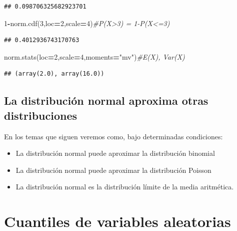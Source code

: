\documentclass[]{book}
\newenvironment{Shaded}{\begin{snugshade}}{\end{snugshade}}
\newcommand{\CommentTok}[1]{\textcolor[rgb]{0.56,0.35,0.01}{\textit{#1}}}
\newcommand{\DecValTok}[1]{\textcolor[rgb]{0.00,0.00,0.81}{#1}}
\newcommand{\NormalTok}[1]{#1}
\newcommand{\OperatorTok}[1]{\textcolor[rgb]{0.81,0.36,0.00}{\textbf{#1}}}
\newcommand{\StringTok}[1]{\textcolor[rgb]{0.31,0.60,0.02}{#1}}
\providecommand{\tightlist}{%
  \setlength{\itemsep}{0pt}\setlength{\parskip}{0pt}}
\begin{document}
\begin{verbatim}
## 0.098706325682923701
\end{verbatim}

\begin{Shaded}
\begin{Highlighting}[]
\DecValTok{1}\OperatorTok{-}\NormalTok{norm.cdf(}\DecValTok{3}\NormalTok{,loc}\OperatorTok{=}\DecValTok{2}\NormalTok{,scale}\OperatorTok{=}\DecValTok{4}\NormalTok{)}\CommentTok{#P(X>3) = 1-P(X<=3)}
\end{Highlighting}
\end{Shaded}

\begin{verbatim}
## 0.4012936743170763
\end{verbatim}

\begin{Shaded}
\begin{Highlighting}[]
\NormalTok{norm.stats(loc}\OperatorTok{=}\DecValTok{2}\NormalTok{,scale}\OperatorTok{=}\DecValTok{4}\NormalTok{,moments}\OperatorTok{=}\StringTok{"mv"}\NormalTok{)}\CommentTok{#E(X), Var(X)}
\end{Highlighting}
\end{Shaded}

\begin{verbatim}
## (array(2.0), array(16.0))
\end{verbatim}

\hypertarget{la-distribuciuxf3n-normal-aproxima-otras-distribuciones}{%
\subsection{La distribución normal aproxima otras distribuciones}\label{la-distribuciuxf3n-normal-aproxima-otras-distribuciones}}

En los temas que siguen veremos como, bajo determinadas condiciones:

\begin{itemize}
\tightlist
\item
  La distribución normal puede aproximar la distribución binomial
\item
  La distribución normal puede aproximar la distribución Poisson
\item
  La distribución normal es la distribución límite de la media aritmética.
\end{itemize}

\hypertarget{cuantiles-de-variables-aleatorias}{%
\section{Cuantiles de variables aleatorias}\label{cuantiles-de-variables-aleatorias}}
\end{document}
